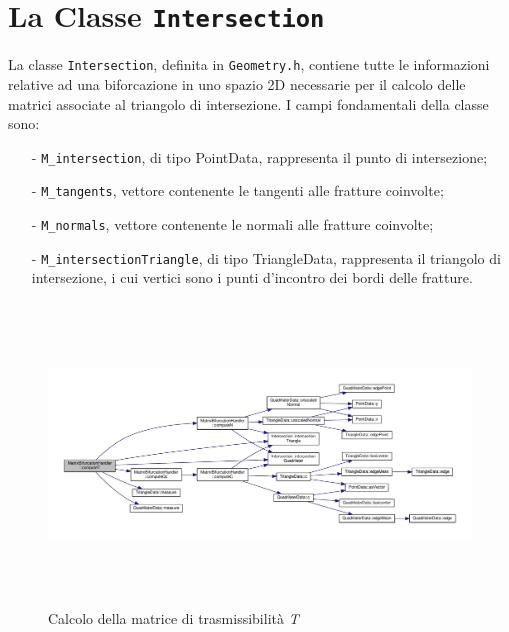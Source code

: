 \section{La Classe \texttt{Intersection}}

La classe \texttt{Intersection}, definita in \texttt{Geometry.h}, contiene tutte le informazioni relative ad una biforcazione in uno spazio 2D necessarie per il calcolo delle matrici associate al triangolo di intersezione.
I campi fondamentali della classe sono:
	\begin{enumerate}
	\item[-] \texttt{M\_intersection}, di tipo PointData, rappresenta il punto di intersezione;
	\item[-] \texttt{M\_tangents}, vettore contenente le tangenti alle fratture coinvolte;
	\item[-] \texttt{M\_normals}, vettore contenente le normali alle fratture coinvolte;
	\item[-] \texttt{M\_intersectionTriangle}, di tipo TriangleData, rappresenta il triangolo di intersezione, i cui vertici sono i punti d'incontro dei bordi delle fratture.
	\end{enumerate} 

	
	
	
	
	
%	

\begin{figure}[htbp]
\centering
\includegraphics[height= 8cm, angle=90]{img/subcap3_3/dipendenze.pdf}
\caption{Calcolo della matrice di trasmissibilità \textit{T}}
\end{figure}


